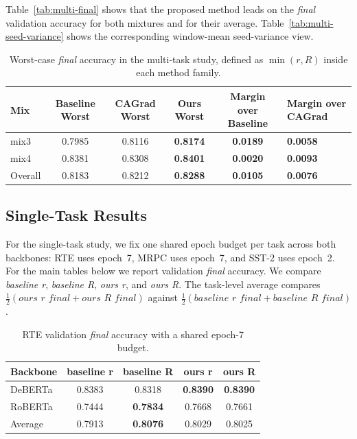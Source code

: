\documentclass{article}
\begin{document}
Table~\ref{tab:multi-final} shows that the proposed method leads on the
\textit{final} validation accuracy for both mixtures and for their average.
Table~\ref{tab:multi-seed-variance} shows the corresponding window-mean
seed-variance view.

\begin{table}[H]
\centering
\caption{Worst-case \textit{final} accuracy in the multi-task study, defined as
$\min(r, R)$ inside each method family.}
\label{tab:multi-worst-final}
\begin{tabular}{lcccc}
\toprule
Mix & Baseline Worst & CAGrad Worst & Ours Worst & Margin over Baseline & Margin over CAGrad \\
\midrule
mix3 & 0.7985 & 0.8116 & \textbf{0.8174} & \textbf{0.0189} & \textbf{0.0058} \\
mix4 & 0.8381 & 0.8308 & \textbf{0.8401} & \textbf{0.0020} & \textbf{0.0093} \\
Overall & 0.8183 & 0.8212 & \textbf{0.8288} & \textbf{0.0105} & \textbf{0.0076} \\
\bottomrule
\end{tabular}
\end{table}

\subsection{Single-Task Results}

For the single-task study, we fix one shared epoch budget per task across both
backbones: RTE uses epoch~7, MRPC uses epoch~7, and SST-2 uses epoch~2.  For
the main tables below we report validation \textit{final} accuracy. We compare
\textit{baseline r}, \textit{baseline R}, \textit{ours r}, and \textit{ours R}.
The task-level average compares
$\frac{1}{2}(\textit{ours r final}+\textit{ours R final})$ against
$\frac{1}{2}(\textit{baseline r final}+\textit{baseline R final})$.

\begin{table}[H]
\centering
\caption{RTE validation \textit{final} accuracy with a shared epoch-7 budget.}
\label{tab:single-rte-fixed}
\small
\begin{tabular}{lcccc}
\toprule
\multirow{2}{*}{Backbone} & baseline r & baseline R & ours r & ours R \\
\midrule
DeBERTa & 0.8383 & 0.8318 & \textbf{0.8390} & \textbf{0.8390} \\
RoBERTa & 0.7444 & \textbf{0.7834} & 0.7668 & 0.7661 \\
Average & 0.7913 & \textbf{0.8076} & 0.8029 & 0.8025 \\
\bottomrule
\end{tabular}
\end{table}
\end{document}
